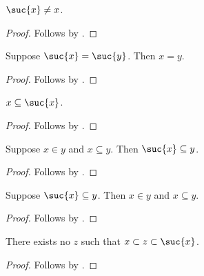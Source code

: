 \begin{proposition}\label{suc_neq_self}
    $\suc{x}\neq x$.
\end{proposition}
\begin{proof}
    Follows by .
\end{proof}

\begin{proposition}\label{suc_injective}
    Suppose $\suc{x} = \suc{y}$. Then $x = y$.
\end{proposition}
\begin{proof}
    Follows by .
\end{proof}

\begin{proposition}\label{subseteq_self_suc_intro}
    $x\subseteq\suc{x}$.
\end{proposition}
\begin{proof}
    Follows by .
\end{proof}

\begin{proposition}\label{suc_subseteq_intro}
    Suppose $x\in y$ and $x\subseteq y$.
    Then $\suc{x}\subseteq y$.
\end{proposition}
\begin{proof}
    Follows by .
\end{proof}

\begin{proposition}\label{suc_subseteq_elim}
    Suppose $\suc{x}\subseteq y$.
    Then $x\in y$ and $x\subseteq y$.
\end{proposition}
\begin{proof}
    Follows by .
\end{proof}

\begin{proposition}\label{suc_next_subset}
    There exists no $z$ such that $x\subset z\subset \suc{x}$.
\end{proposition}
\begin{proof}
    Follows by .
\end{proof}
